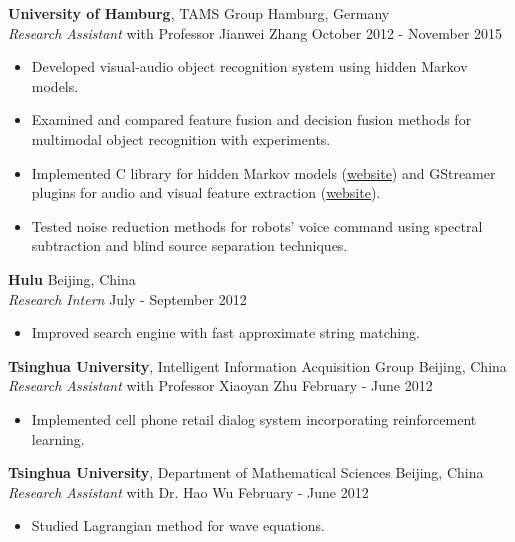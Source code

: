 \documentclass[a4paper,11pt]{article} %
\begin{document}

\textbf{University of Hamburg}, TAMS Group \hfill Hamburg, Germany \\
\textit{Research Assistant} with Professor Jianwei Zhang \hfill October 2012 - November 2015
\vspace{-\parskip}
\begin{itemize}
  \item Developed visual-audio object recognition system using hidden Markov models.
  \item Examined and compared feature fusion and decision fusion methods for multimodal object recognition with experiments.
  \item Implemented C library for hidden Markov models (\href{https://github.com/hwp/notGHMM}{website}) and GStreamer plugins for audio and visual feature extraction (\href{https://github.com/hwp/gval}{website}).
  \item Tested noise reduction methods for robots' voice command using spectral subtraction and blind source separation techniques.
\end{itemize}


\textbf{Hulu} \hfill Beijing, China \\
\textit{Research Intern} \hfill July - September 2012
\vspace{-\parskip}
\begin{itemize}
  \item Improved search engine with fast approximate string matching.
\end{itemize}


\textbf{Tsinghua University}, Intelligent Information Acquisition Group \hfill Beijing, China \\
\textit{Research Assistant} with Professor Xiaoyan Zhu \hfill February - June 2012
\vspace{-\parskip}
\begin{itemize}
  \item Implemented cell phone retail dialog system incorporating reinforcement learning.
\end{itemize}


\textbf{Tsinghua University}, Department of Mathematical Sciences \hfill Beijing, China \\
\textit{Research Assistant} with Dr. Hao Wu \hfill February - June 2012
\vspace{-\parskip}
\begin{itemize}
  \item Studied Lagrangian method for wave equations.
\end{itemize}
\end{document}
